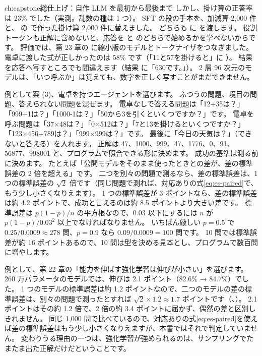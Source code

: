 \begin{answers}{ch:capstone}{総仕上げ：自作 LLM を最初から最後まで}
しかし、掛け算の正答率は 23\% でした（実測。乱数の種は 1 つ）。
SFT の段の手本を、加減算 2,000 件と、 の  で作った掛け算 2,000 件に替えました。
どちらも  に  を渡します。
役割トークンも正解に含めないと、応答を  と  のどちらで始めるかを学べないからです。
評価では、第 23 章の  に縮小版のモデルとトークナイザをつなぎました。
電卓に渡した式が正しかったのは 58\% です（「11と57を掛けると」に ）。
結果を応答へ写すところでも間違えます（結果  に「630です。」）。
2 層 96 次元のモデルは、「いつ呼ぶか」は覚えても、数字を正しく写すことがまだできません。
\item 例として案 (3)、電卓を持つエージェントを選びます。
ふつうの問題、境目の問題、答えられない問題を混ぜます。
電卓なしで答える問題は「12+35は？」「999+1は？」「1000-1は？」「50から3を引くといくつですか？」です。
電卓を呼ぶ問題は「37×48は？」「0×512は？」「7と13を掛けるといくつですか？」「123×456+789は？」「999×999は？」です。
最後に「今日の天気は？」（できないと答える）を入れます。
正解は 47、1000、999、47、1776、0、91、56877、998001 と、プログラムで照合できる形に決めます。
成功の基準は測る前に決めます。
たとえば「公開モデルをそのまま使ったときとの差が、差の標準誤差の 2 倍を超える」です。
二つを別々の問題で測るなら、差の標準誤差は、1 つの標準誤差の $\sqrt2$ 倍です（同じ問題で測れば、対応ありの式\eqref{eq:es-paired}で、もう少し小さくなりえます）。
1 つの標準誤差が 3 ポイントなら、差の標準誤差は約 4.2 ポイントで、成功と言えるのは約 8.5 ポイントより大きい差です。
標準誤差は $p(1-p)/n$ の平方根なので、0.03 以下にするには $n$ が $p(1-p)/0.03^{2}$ 以上でなければなりません。
いちばん厳しい $p=0.5$ で $0.25/0.0009\approx278$ 問、$p=0.9$ なら $0.09/0.0009=100$ 問です。
10 問では標準誤差が約 16 ポイントあるので、10 問は型を決める見本とし、プログラムで数百問に増やします。
\item 例として、第 22 章の「能力を伸ばす強化学習は伸びが小さい」を選びます。
260 万パラメータのモデルでは、伸びは 2.1 ポイント（82.6\% → 84.7\%）でした。
1 つのモデルの標準誤差は約 1.2 ポイントなので、二つのモデルの差の標準誤差は、別々の問題で測ったとすれば $\sqrt2\times1.2\approx1.7$ ポイントです（、）。
2.1 ポイントはその約 1.2 倍で、2 倍の約 3.4 ポイントに届かず、偶然の差と区別しきれません。
同じ 1,000 問で比べているので、対応ありの式\eqref{eq:es-paired}を使えば差の標準誤差はもう少し小さくなりえますが、本書ではそれで判定していません。
変わりうる理由の一つは、強化学習が強められるのは、サンプリングでたまたま出た正解だけだということです。

\end{answers}
